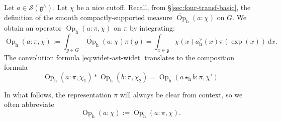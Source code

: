 \documentclass[reqno]{amsart}
\DeclareMathOperator{\h}{h}
\DeclareMathOperator{\Opp}{Op}
\theoremstyle{plain} \newtheorem{theorem} {Theorem}
\theoremstyle{definition} \newtheorem{definition} [theorem] {Definition}
\theoremstyle{itplain} %
\numberwithin{equation}{section}
\numberwithin{theorem}{section}
\begin{document}
Let $a \in \mathcal{S}(\mathfrak{g}^\wedge)$.  Let $\chi$ be a nice cutoff.  Recall, from \S\ref{sec:four-transf-basic}, the definition of the smooth compactly-supported measure $\widetilde{\Opp}_{\h}(a:\chi)$ on $G$.  We obtain an operator $\Opp_{\h}(a:\pi,\chi)$ on $\pi$ by integrating: \index{operators!$\Opp$}
\begin{equation*}
  \Opp_{\h}(a:\pi,\chi) := \int _{g \in G} \widetilde{\Opp}_{\h}(a:\chi) \pi(g)
  =
  \int _{x \in \mathfrak{g} } \chi(x) a_{\h}^\vee(x) \pi(\exp(x)) \, d x.
\end{equation*}
The convolution formula \eqref{eq:widet-ast-widet} translates to the composition formula
\begin{equation}\label{eq:composition-formula-most-basic}
  {\Opp}_{\h}(a:\pi,\chi_1) \ast
  {\Opp}_{\h}(b:\pi,\chi_2)
  =
  {\Opp}_{\h}(a \star_{\h} b:\pi,\chi')
\end{equation}

In what follows, the representation $\pi$ will always be clear from context, so we often abbreviate
\begin{equation*}
  \Opp_{\h}(a:\chi) := \Opp_{\h}(a:\pi,\chi).
\end{equation*}
\end{document}
